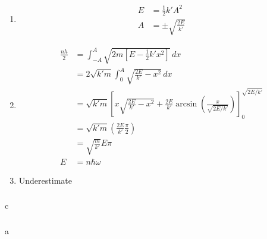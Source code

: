 \documentclass{article}
\begin{document}
\begin{enumerate}
  \item

        \begin{align*}
          E & = \frac{1}{2} k' A^2        \\
          A & = \pm \sqrt{\frac{2 E}{k'}}
        \end{align*}

  \item

        \begin{align*}
          \frac{n h}{2} & = \int_{-A}^A \sqrt{2 m [E - \frac{1}{2} k' x^2]} \,dx                                                                                           \\
                        & = 2 \sqrt{k' m} \int_0^A \sqrt{\frac{2 E}{k'} - x^2} \,dx                                                                                        \\
                        & = \sqrt{k' m} \left[ x \sqrt{\frac{2 E}{k'} - x^2} + \frac{2 E}{k'} \arcsin \left( \frac{x}{\sqrt{2 E / k'}} \right) \right]_0^{\sqrt{2 E / k'}} \\
                        & = \sqrt{k' m} \left( \frac{2 E}{k'} \frac{\pi}{2} \right)                                                                                        \\
                        & = \sqrt{\frac{m}{k'}} E \pi                                                                                                                      \\
          E             & = n \hbar \omega
        \end{align*}

  \item Underestimate
\end{enumerate}

\setcounter{subsubsection}{66}
\subsubsection{}

c

\setcounter{subsubsection}{68}
\subsubsection{}

a
\end{document}

